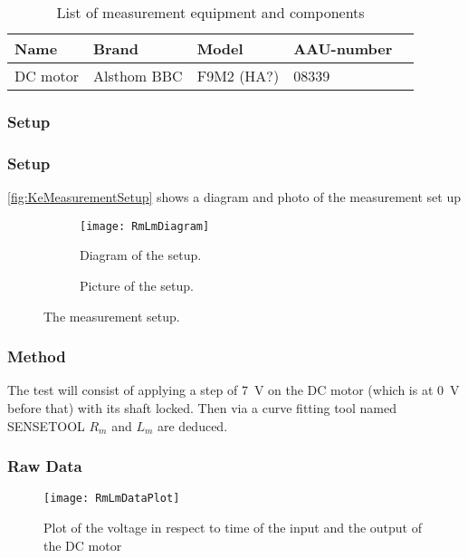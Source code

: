 \begin{table}[htbp]
	\centering
	\caption{List of measurement equipment and components}\label{tab_appendix:LaSetUp}
	
	\begin{tabularx}{\textwidth}{lXXXX}
		Name 				& Brand	& Model & AAU-number									\\ \toprule \rowcolor{lightGrey}
		
		DC motor & Alsthom BBC & F9M2 (HA?)& 08339 
	\end{tabularx}
\end{table}


\subsubsection*{Setup}

\subsubsection*{Setup}
\autoref{fig:KeMeasurementSetup} shows a diagram and photo of the measurement set up
\begin{figure}[htbp]
	\centering
	\begin{subfigure}{0.50\textwidth}
		\texttt{[image: RmLmDiagram]}
		\caption{Diagram of the setup.} \label{fig:RmLmMeasurementDiagram}
	\end{subfigure}
	\begin{subfigure}{0.40\textwidth}
		\caption{Picture of the setup.} \label{fig:RmLmMeasurementPictures}
	\end{subfigure}
	\caption{The measurement setup.} \label{fig:RmLmMeasurementSetup}   
\end{figure}

\subsubsection*{Method}
The test will consist of applying a step of \SI{7}{\volt} on the DC motor (which is at \SI{0}{\volt} before that) with its shaft locked. Then via a curve fitting tool named SENSETOOL $R_m$ and $L_m$ are deduced.

\subsubsection*{Raw Data}

\begin{figure}[htbp]
	\centering
	\texttt{[image: RmLmDataPlot]}
	\caption{Plot of the voltage in respect to time of the input and the output of the DC motor}\label{fig:RmLmTestDataPlot}
\end{figure}

